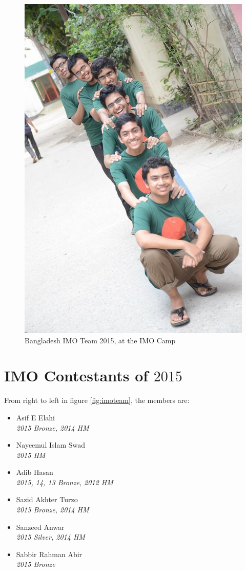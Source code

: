 \documentclass{subfile}
\begin{document}
	\begin{center}
		\begin{figure}
			\centering
			\includegraphics[scale=.6]{imoteam}
			\caption{Bangladesh IMO Team 2015, at the IMO Camp}
			\label{fig:imoteam}
		\end{figure}
	\end{center}
	\section*{IMO Contestants of $2015$}
	From right to left in figure \eqref{fig:imoteam}, the members are:
	\begin{itemize}
		\item Asif E Elahi\\ \textit {2015 Bronze, 2014 HM}
		\item Nayeemul Islam Swad\\ \textit { 2015 HM}
		\item Adib Hasan\\ \textit {2015, 14, 13 Bronze, 2012 HM}
		\item Sazid Akhter Turzo\\ \textit {2015 Bronze, 2014 HM}
		\item Sanzeed Anwar\\ \textit {2015 Silver, 2014 HM}
		\item Sabbir Rahman Abir\\ \textit {2015 Bronze}
	\end{itemize}
	
\end{document}
